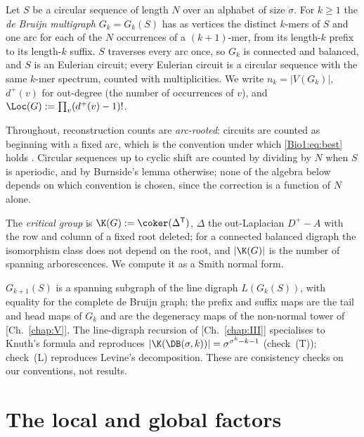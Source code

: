 Let $S$ be a circular sequence of length $N$ over an alphabet of size $\sigma$. For $k\ge1$
the \emph{de Bruijn multigraph} $G_k=G_k(S)$ has as vertices the distinct $k$-mers of $S$
and one arc for each of the $N$ occurrences of a $(k{+}1)$-mer, from its length-$k$ prefix
to its length-$k$ suffix. $S$ traverses every arc once, so $G_k$ is connected and balanced,
and $S$ is an Eulerian circuit; every Eulerian circuit is a circular sequence with the
same $k$-mer spectrum, counted with multiplicities. We write $n_k=|V(G_k)|$, $d^{+}(v)$ for
out-degree (the number of occurrences of $v$), and $\Loc(G):=\prod_v(d^{+}(v)-1)!$.

\begin{remark}\label{Bio1:rem:convention}
Throughout, reconstruction counts are \emph{arc-rooted}: circuits are counted as beginning
with a fixed arc, which is the convention under which \eqref{Bio1:eq:best} holds
\cite{AEdB,SmithTutte}. Circular sequences up to cyclic shift are counted by dividing by
$N$ when $S$ is aperiodic, and by Burnside's lemma otherwise; none of the algebra below
depends on which convention is chosen, since the correction is a function of $N$ alone.
\end{remark}

The \emph{critical group} is $\K(G):=\coker(\Delta^{\mathsf T})$, $\Delta$ the out-Laplacian
$D^{+}-A$ with the row and column of a fixed root deleted; for a connected balanced digraph
the isomorphism class does not depend on the root, and $|\K(G)|$ is the number of spanning
arborescences. We compute it as a Smith normal form.

\begin{remark}\label{Bio1:rem:tower}
$G_{k+1}(S)$ is a spanning subgraph of the line digraph $L(G_k(S))$, with equality for the
complete de Bruijn graph; the prefix and suffix maps are the tail and head maps of $G_k$
and are the degeneracy maps of the non-normal tower of [Ch.~\ref{chap:V}]. The line-digraph
recursion of [Ch.~\ref{chap:III}] specialises to Knuth's formula and reproduces
$|\K(\DB(\sigma,k))|=\sigma^{\sigma^{k}-k-1}$ (check~(T)); check~(L) reproduces Levine's
decomposition. These are consistency checks on our conventions, not results.
\end{remark}

\section{The local and global factors}\label{Bio1:sec:decomp}

